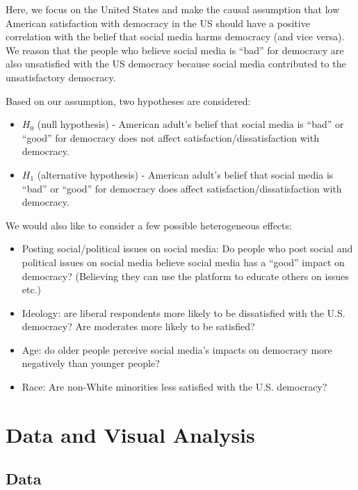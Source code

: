 \documentclass[
]{article}
\begin{document}
Here, we focus on the United States and make the causal assumption that
low American satisfaction with democracy in the US should have a
positive correlation with the belief that social media harms democracy
(and vice versa). We reason that the people who believe social media is
``bad'' for democracy are also unsatisfied with the US democracy because
social media contributed to the unsatisfactory democracy.

Based on our assumption, two hypotheses are considered:

\begin{itemize}
\item
  \(H_0\) (null hypothesis) - American adult's belief that social media
  is ``bad'' or ``good'' for democracy does not affect
  satisfaction/dissatisfaction with democracy.
\item
  \(H_1\) (alternative hypothesis) - American adult's belief that social
  media is ``bad'' or ``good'' for democracy does affect
  satisfaction/dissatisfaction with democracy.
\end{itemize}

We would also like to consider a few possible heterogeneous effects:

\begin{itemize}
\item
  Posting social/political issues on social media: Do people who post
  social and political issues on social media believe social media has a
  ``good'' impact on democracy? (Believing they can use the platform to
  educate others on issues etc.)
\item
  Ideology: are liberal respondents more likely to be dissatisfied with
  the U.S. democracy? Are moderates more likely to be satisfied?
\item
  Age: do older people perceive social media's impacts on democracy more
  negatively than younger people?
\item
  Race: Are non-White minorities less satisfied with the U.S. democracy?
\end{itemize}

\hypertarget{data-and-visual-analysis}{%
\section{Data and Visual Analysis}\label{data-and-visual-analysis}}

\hypertarget{data}{%
\subsection{Data}\label{data}}
\end{document}
